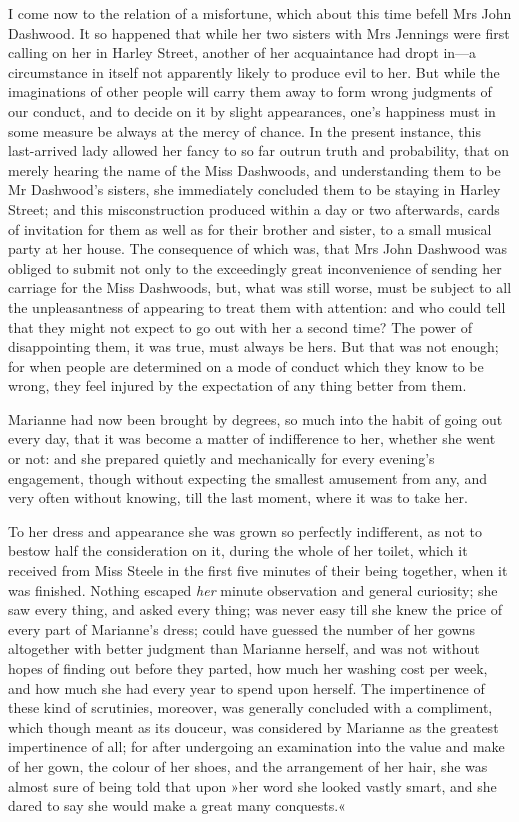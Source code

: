I come now to the relation of a misfortune, which about this time befell Mrs John Dashwood. It so happened that while her two sisters with Mrs Jennings were first calling on her in Harley Street, another of her acquaintance had dropt in—a circumstance in itself not apparently likely to produce evil to her. But while the imaginations of other people will carry them away to form wrong judgments of our conduct, and to decide on it by slight appearances, one’s happiness must in some measure be always at the mercy of chance. In the present instance, this last-arrived lady allowed her fancy to so far outrun truth and probability, that on merely hearing the name of the Miss Dashwoods, and understanding them to be Mr Dashwood’s sisters, she immediately concluded them to be staying in Harley Street; and this misconstruction produced within a day or two afterwards, cards of invitation for them as well as for their brother and sister, to a small musical party at her house. The consequence of which was, that Mrs John Dashwood was obliged to submit not only to the exceedingly great inconvenience of sending her carriage for the Miss Dashwoods, but, what was still worse, must be subject to all the unpleasantness of appearing to treat them with attention: and who could tell that they might not expect to go out with her a second time? The power of disappointing them, it was true, must always be hers. But that was not enough; for when people are determined on a mode of conduct which they know to be wrong, they feel injured by the expectation of any thing better from them.

Marianne had now been brought by degrees, so much into the habit of going out every day, that it was become a matter of indifference to her, whether she went or not: and she prepared quietly and mechanically for every evening’s engagement, though without expecting the smallest amusement from any, and very often without knowing, till the last moment, where it was to take her.

To her dress and appearance she was grown so perfectly indifferent, as not to bestow half the consideration on it, during the whole of her toilet, which it received from Miss Steele in the first five minutes of their being together, when it was finished. Nothing escaped \textit{her} minute observation and general curiosity; she saw every thing, and asked every thing; was never easy till she knew the price of every part of Marianne’s dress; could have guessed the number of her gowns altogether with better judgment than Marianne herself, and was not without hopes of finding out before they parted, how much her washing cost per week, and how much she had every year to spend upon herself. The impertinence of these kind of scrutinies, moreover, was generally concluded with a compliment, which though meant as its douceur, was considered by Marianne as the greatest impertinence of all; for after undergoing an examination into the value and make of her gown, the colour of her shoes, and the arrangement of her hair, she was almost sure of being told that upon »her word she looked vastly smart, and she dared to say she would make a great many conquests.«

